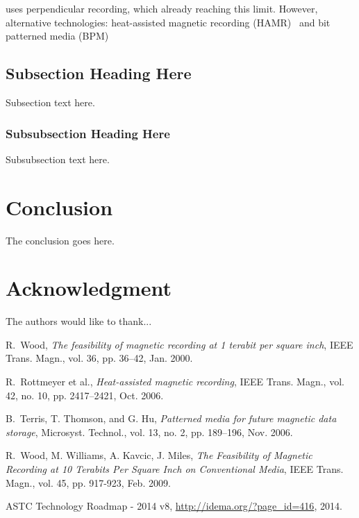 \documentclass[conference]{IEEEtran}
\begin{document}


uses perpendicular recording, which already reaching this limit.
However, alternative technologies: heat-assisted magnetic recording (HAMR)~\cite{Rottmeyer} and bit patterned media (BPM)~\cite{Terris}

\subsection{Subsection Heading Here}
Subsection text here.


\subsubsection{Subsubsection Heading Here}
Subsubsection text here.



\section{Conclusion}
The conclusion goes here.


\section*{Acknowledgment}


The authors would like to thank...

\begin{thebibliography}{1}

R.~Wood, \emph{The feasibility of magnetic recording at 1 terabit per square
inch}, IEEE Trans. Magn., vol. 36, pp. 36–42, Jan. 2000.

R.~Rottmeyer et al., \emph{Heat-assisted magnetic recording}, IEEE Trans.
Magn., vol. 42, no. 10, pp. 2417–2421, Oct. 2006.

B.~Terris, T. Thomson, and G. Hu, \emph{Patterned media for future magnetic
data storage}, Microsyst. Technol., vol. 13, no. 2, pp. 189–196, Nov.
2006.

R.~Wood, M. Williams, A. Kavcic, J. Miles, \emph{The Feasibility of Magnetic Recording at 10 Terabits Per Square Inch on Conventional Media}, IEEE Trans. Magn., vol. 45, pp. 917-923, Feb. 2009.

ASTC Technology Roadmap - 2014 v8, \url{http://idema.org/?page_id=416}, 2014.

\end{thebibliography}


\end{document}
